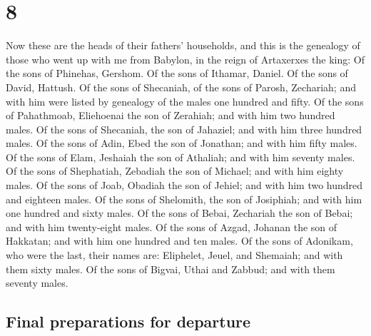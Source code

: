 \hypertarget{section-7}{%
\section{8}\label{section-7}}

 Now these are the heads of their fathers' households, and
this is the genealogy of those who went up with me from Babylon, in the
reign of Artaxerxes the king:  Of the sons of Phinehas,
Gershom. Of the sons of Ithamar, Daniel. Of the sons of David, Hattush.
 Of the sons of Shecaniah, of the sons of Parosh,
Zechariah; and with him were listed by genealogy of the males one
hundred and fifty.  Of the sons of Pahathmoab, Eliehoenai
the son of Zerahiah; and with him two hundred males.  Of
the sons of Shecaniah, the son of Jahaziel; and with him three hundred
males.  Of the sons of Adin, Ebed the son of Jonathan; and
with him fifty males.  Of the sons of Elam, Jeshaiah the
son of Athaliah; and with him seventy males.  Of the sons
of Shephatiah, Zebadiah the son of Michael; and with him eighty males.
 Of the sons of Joab, Obadiah the son of Jehiel; and with
him two hundred and eighteen males.  Of the sons of
Shelomith, the son of Josiphiah; and with him one hundred and sixty
males.  Of the sons of Bebai, Zechariah the son of Bebai;
and with him twenty-eight males.  Of the sons of Azgad,
Johanan the son of Hakkatan; and with him one hundred and ten males.
 Of the sons of Adonikam, who were the last, their names
are: Eliphelet, Jeuel, and Shemaiah; and with them sixty males.
 Of the sons of Bigvai, Uthai and Zabbud; and with them
seventy males.

\hypertarget{final-preparations-for-departure}{%
\subsection{Final preparations for
departure}\label{final-preparations-for-departure}}

